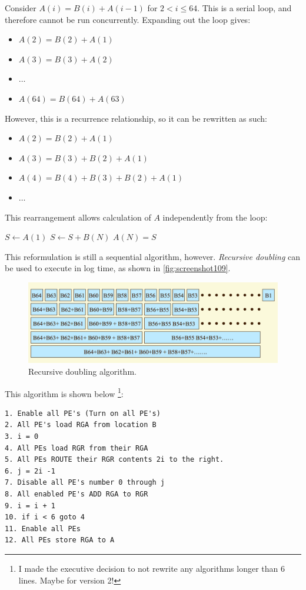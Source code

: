 Consider $A(i) = B(i) + A(i-1)$ for $2 < i \le 64$. This is a serial loop, and therefore cannot be run concurrently. Expanding out the loop gives: \begin{itemize}
\item $A(2) = B(2) + A(1)$
\item $A(3) = B(3) + A(2)$
\item $\dots$
\item $A(64) = B(64) + A(63)$
\end{itemize}
However, this is a recurrence relationship, so it can be rewritten as such:
\begin{itemize}
\item $A(2) = B(2) + A(1)$
\item $A(3) = B(3) + B(2) + A(1)$
\item $A(4) = B(4) + B(3) + B(2) + A(1)$
\item $\dots$
\end{itemize}
This rearrangement allows calculation of $A$ independently from the loop:
\begin{algorithmic}
\State $S \gets A(1)$
	\State $S \gets S + B(N)$
\EndFor
\State $A(N) = S$
\end{algorithmic}
This reformulation is still a sequential algorithm, however. \textit{Recursive doubling} can be used to execute in log time, as shown in \autoref{fig:screenshot109}.

\begin{figure}
\centering
\includegraphics[width=0.7\linewidth]{screenshot109}
\caption{Recursive doubling algorithm.}
\label{fig:screenshot109}
\end{figure}

This algorithm is shown below \footnote{I made the executive decision to not rewrite any algorithms longer than 6 lines. Maybe for version 2!}:
\begin{lstlisting}[language={}]
1. Enable all PE's (Turn on all PE's) 
2. All PE's load RGA from location B 
3. i = 0 
4. All PEs load RGR from their RGA 
5. All PEs ROUTE their RGR contents 2i to the right. 
6. j = 2i -1 
7. Disable all PE's number 0 through j 
8. All enabled PE's ADD RGA to RGR 
9. i = i + 1 
10. if i < 6 goto 4 
11. Enable all PEs 
12. All PEs store RGA to A 
\end{lstlisting}